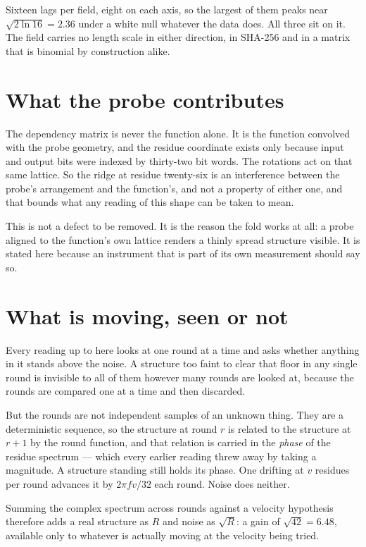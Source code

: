 Sixteen lags per field, eight on each axis, so the largest of them peaks near
\(\sqrt{2 \ln 16} = 2.36\) under a white null whatever the data does. All three sit on it. The
field carries no length scale in either direction, in SHA-256 and in a matrix that is binomial by
construction alike.

\section{What the probe contributes}

The dependency matrix is never the function alone. It is the function convolved with the probe
geometry, and the residue coordinate exists only because input and output bits were indexed by
thirty-two bit words. The rotations act on that same lattice. So the ridge at residue twenty-six is
an interference between the probe's arrangement and the function's, and not a property of
either one, and that bounds what any reading of this shape can be taken to mean.

This is not a defect to be removed. It is the reason the fold works at all: a probe aligned to the
function's own lattice renders a thinly spread structure visible. It is stated here because
an instrument that is part of its own measurement should say so.

\section{What is moving, seen or not}

Every reading up to here looks at one round at a time and asks whether anything in it stands above
the noise. A structure too faint to clear that floor in any single round is invisible to all of
them however many rounds are looked at, because the rounds are compared one at a time and then
discarded.

But the rounds are not independent samples of an unknown thing. They are a deterministic sequence,
so the structure at round \(r\) is related to the structure at \(r+1\) by the round function, and
that relation is carried in the \emph{phase} of the residue spectrum --- which every earlier
reading threw away by taking a magnitude. A structure standing still holds its phase. One drifting
at \(v\) residues per round advances it by \(2\pi f v / 32\) each round. Noise does neither.

Summing the complex spectrum across rounds against a velocity hypothesis therefore adds a real
structure as \(R\) and noise as \(\sqrt{R}\): a gain of \(\sqrt{42} = 6.48\), available only to
whatever is actually moving at the velocity being tried.

